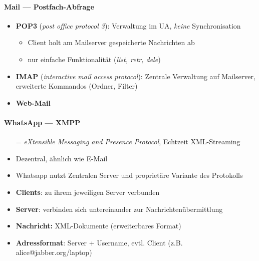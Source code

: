 \paragraph{Mail --- Postfach-Abfrage}
\begin{itemize}
  \item \textbf{POP3} (\emph{post office protocol 3}): Verwaltung im UA, \emph{keine} Synchronisation
  \begin{itemize}
    \item Client holt am Mailserver gespeicherte Nachrichten ab
    \item nur einfache Funktionalität (\textit{list, retr, dele})
  \end{itemize}
  \item \textbf{IMAP} (\emph{interactive mail access protocol}): Zentrale Verwaltung auf Mailserver, erweiterte Kommandos (Ordner, Filter)
  \item \textbf{Web-Mail}
\end{itemize}

\paragraph{WhatsApp --- XMPP}
\begin{itemize}
  \item[=] \emph{eXtensible Messaging and Presence Protocol}, Echtzeit XML-Streaming
  \item Dezentral, ähnlich wie E-Mail
  \item Whatsapp nutzt Zentralen Server und proprietäre Variante des Protokolls
  \item \textbf{Clients}: zu ihrem jeweiligen Server verbunden
  \item \textbf{Server}: verbinden sich untereinander zur Nachrichtenübermittlung
  \item \textbf{Nachricht:} XML-Dokumente (erweiterbares Format)
  \item \textbf{Adressformat}: Server + Username, evtl. Client (z.B. alice@jabber.org/laptop)
\end{itemize}

